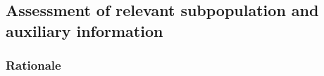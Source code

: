\documentclass[utf8]{FrontiersinHarvard_mod} %
\renewcommand*{\|}[1][]{\nonscript\:#1\vert\nonscript\:\mathopen{}}
\begin{document}








\bigskip%
\subsection{Assessment of relevant subpopulation and auxiliary information}
\label{sec:population_step}

\subsubsection{Rationale}
\label{sec:population_step_rationale}
\end{document}
